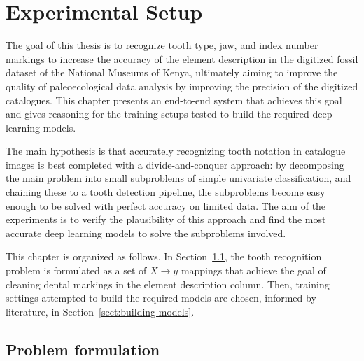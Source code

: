 \documentclass[english,twoside,openright]{UH_DS_MSc}
\begin{document}
\chapter{Experimental Setup}

The goal of this thesis is to recognize tooth type,
jaw, and index number markings to increase the accuracy of the element description in
the digitized fossil dataset of the National Museums of Kenya, ultimately aiming to improve the quality of paleoecological data analysis by improving the precision of the digitized catalogues. This 
chapter presents an end-to-end system that achieves this goal and gives reasoning 
for the training setups tested to build  the required deep learning models.

The main hypothesis is that accurately recognizing tooth notation in catalogue images 
is best completed with a divide-and-conquer approach: by decomposing the main problem into small
subproblems of simple univariate classification, and chaining these to a tooth detection pipeline,
the subproblems become easy enough to be solved with perfect accuracy on limited data.
The aim of the experiments is to verify the plausibility of this approach and find the most accurate deep 
learning models to solve the subproblems involved.

This chapter is organized as follows. In Section~\ref{sect:problem-formulation}, the tooth recognition problem is formulated as a set of $X\to y$ 
mappings that achieve the goal of cleaning dental markings in the element description column.
Then, training settings attempted to build the required models are chosen, informed by literature, in Section~\ref{sect:building-models}.

\section{Problem formulation}
\label{sect:problem-formulation}
\end{document}
